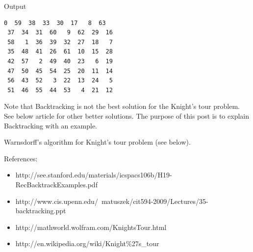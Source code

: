 Output
\begin{lstlisting}[style=rayio]
  0  59  38  33  30  17   8  63
 37  34  31  60   9  62  29  16
 58   1  36  39  32  27  18   7
 35  48  41  26  61  10  15  28
 42  57   2  49  40  23   6  19
 47  50  45  54  25  20  11  14
 56  43  52   3  22  13  24   5
 51  46  55  44  53   4  21  12
\end{lstlisting}
Note that Backtracking is not the best solution for the Knight's tour
problem. See below article for other better solutions. The purpose of this
post is to explain Backtracking with an example.

Warnsdorff's algorithm for Knight's tour problem (see below).

References:
\begin{itemize}[noitemsep,topsep=0pt]
\item
  http://see.stanford.edu/materials/icspacs106b/H19-RecBacktrackExamples.pdf
\item
  http://www.cis.upenn.edu/~matuszek/cit594-2009/Lectures/35-backtracking.ppt
\item http://mathworld.wolfram.com/KnightsTour.html
\item http://en.wikipedia.org/wiki/Knight\%27s\_tour
\end{itemize}

\textbf{}

\RayNotesBegin

